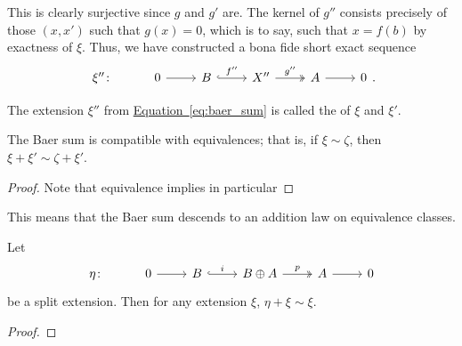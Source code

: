 \documentclass[main.tex]{subfiles}
\begin{document}
This is clearly surjective since $g$ and $g'$ are. The kernel of $g''$ consists precisely of those $(x, x')$ such that $g(x) = 0$, which is to say, such that $x = f(b)$ by exactness of $\xi$. Thus, we have constructed a bona fide short exact sequence
\begin{equation}
  \label{eq:baer_sum}
  \begin{tikzcd}
    \xi''\colon
    & 0
    \arrow[r]
    & B
    \arrow[r, hook, "f''"]
    & X''
    \arrow[r, two heads, "g''"]
    & A
    \arrow[r]
    & 0
  \end{tikzcd}.
\end{equation}

\begin{definition}
  \label{def:baer_sum}
  The extension $\xi''$ from \hyperref[eq:baer_sum]{Equation~\ref*{eq:baer_sum}} is called the  of $\xi$ and $\xi'$.
\end{definition}

\begin{lemma}
  \label{lemma:baer_sum_compatible_with_equivalences}
  The Baer sum is compatible with equivalences; that is, if $\xi \sim \zeta$, then $\xi + \xi' \sim \zeta + \xi'$.
\end{lemma}
\begin{proof}
  Note that equivalence implies in particular
\end{proof}

This means that the Baer sum descends to an addition law on equivalence classes.

\begin{lemma}
  \label{lemma:baer_sum_respects_identity}
  Let
  \begin{equation*}
    \begin{tikzcd}
      \eta\colon
      & 0
      \arrow[r]
      & B
      \arrow[r, hook, "i"]
      & B \oplus A
      \arrow[r, two heads, "p"]
      & A
      \arrow[r]
      & 0
    \end{tikzcd}
  \end{equation*}
  be a split extension. Then for any extension $\xi$, $\eta + \xi \sim \xi$.
\end{lemma}
\begin{proof}
  
\end{proof}
\end{document}
